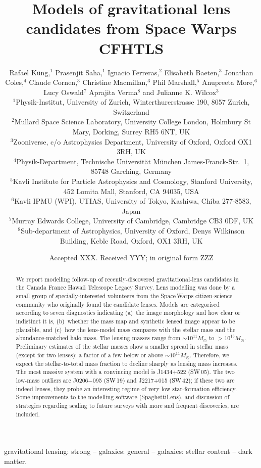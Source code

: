 \documentclass[fleqn,usenatbib]{template/mnras}
\title[Lens models for Space Warps CFHTLS]{Models of gravitational
    lens candidates from Space Warps CFHTLS}
\author[K\"ung et al]{Rafael K\"ung,$^{1}$
Prasenjit Saha,$^{1}$
Ignacio Ferreras,$^{2}$
Elisabeth Baeten,$^{3}$
\newauthor
Jonathan Coles,$^{4}$
Claude Cornen,$^{3}$
Christine Macmillan,$^{3}$
Phil Marshall,$^{5}$ 
\newauthor
Anupreeta More,$^{6}$
Lucy Oswald$^{7}$
Aprajita Verma$^{8}$
and Julianne K. Wilcox$^{3}$
%
\\
%
$^{1}$Physik-Institut, University of Zurich, Winterthurerstrasse 190, 8057 Zurich, Switzerland\\
$^{2}$Mullard Space Science Laboratory, University College London, Holmbury St Mary, Dorking, Surrey RH5 6NT, UK\\
$^{3}$Zooniverse, c/o Astrophysics Department, University of Oxford, Oxford OX1 3RH, UK \\
$^{4}$Physik-Department, Technische Universit\"at M\"unchen
James-Franck-Str.~1, 85748 Garching, Germany\\
$^{5}$Kavli Institute for Particle Astrophysics and Cosmology, Stanford University, 452 Lomita Mall, Stanford, CA 94035, USA\\
$^{6}$Kavli IPMU (WPI), UTIAS, University of Tokyo, Kashiwa, Chiba 277-8583, Japan\\
$^{7}$Murray Edwards College, University of Cambridge, Cambridge CB3 0DF, UK\\
$^{8}$Sub-department of Astrophysics, University of Oxford, Denys Wilkinson Building, Keble Road, Oxford, OX1 3RH, UK\\
}
\date{Accepted XXX. Received YYY; in original form ZZZ}
\newcommand{\SW}{Space\,Warps\xspace}
\newcommand{\sw}[1]{SW\,#1\xspace}
\begin{document}
\label{firstpage}
\pagerange{\pageref{firstpage}--\pageref{lastpage}}
\maketitle

\begin{abstract}
We report modelling follow-up of recently-discovered
gravitational-lens candidates in the Canada France Hawaii Telescope
Legacy Survey. Lens modelling was done by a small group of
specially-interested volunteers from the \SW citizen-science community
who originally found the candidate lenses.  Models are categorised
according to seven diagnostics indicating (a)~the image morphology and
how clear or indistinct it is, (b)~whether the mass map and synthetic
lensed image appear to be plausible, and (c)~how the lens-model mass
compares with the stellar mass and the abundance-matched halo mass.
The lensing masses range from $\sim10^{11}M_\odot$ to
$>10^{13}M_\odot$. Preliminary estimates of the stellar masses show a
smaller spread in stellar mass (except for two lenses): a factor of a
few below or above $\sim10^{11}M_\odot$.  Therefore, we expect the
stellar-to-total mass fraction to decline sharply as lensing mass
increases.  The most massive system with a convincing model is
J1434+522 (\sw{05}).  The two low-mass outliers are J0206$-$095
(\sw{19}) and J2217+015 (\sw{42}); if these two are indeed lenses,
they probe an interesting regime of very low star-formation
efficiency.  Some improvements to the modelling software
(SpaghettiLens), and discussion of strategies regarding scaling to
future surveys with more and frequent discoveries, are included.
\end{abstract}

\begin{keywords}
gravitational lensing: strong -- galaxies: general
-- galaxies: stellar content -- dark matter.
\end{keywords}















\clearpage



\clearpage

\appendix




\bsp	%
\label{lastpage}
\end{document}
